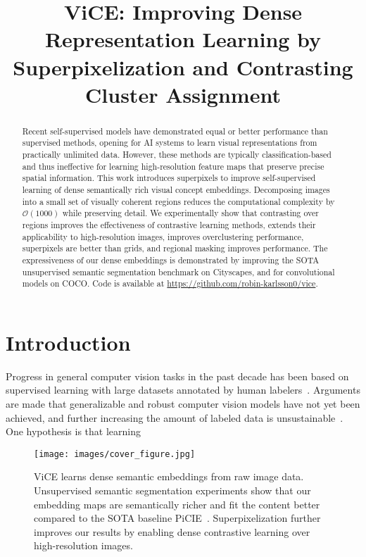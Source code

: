 \documentclass{bmvc2k}
\title{ViCE: Improving Dense Representation Learning by Superpixelization and Contrasting Cluster Assignment}
\begin{document}
\maketitle

\begin{abstract}
Recent self-supervised models have demonstrated equal or better performance than supervised methods, opening for AI systems to learn visual representations from practically unlimited data. However, these methods are typically classification-based and thus ineffective for learning high-resolution feature maps that preserve precise spatial information. This work introduces superpixels to improve self-supervised learning of dense semantically rich visual concept embeddings. Decomposing images into a small set of visually coherent regions reduces the computational complexity by $\mathcal{O}(1000)$ while preserving detail. We experimentally show that contrasting over regions improves the effectiveness of contrastive learning methods, extends their applicability to high-resolution images, improves overclustering performance, superpixels are better than grids, and regional masking improves performance. The expressiveness of our dense embeddings is demonstrated by improving the SOTA unsupervised semantic segmentation benchmark on Cityscapes, and for convolutional models on COCO. Code is available at \url{https://github.com/robin-karlsson0/vice}.
\end{abstract}



\section{Introduction}
\label{sec:introduction}

Progress in general computer vision tasks in the past decade has been based on supervised learning with large datasets annotated by human labelers~\cite{Krizhevsky2012ImageNetConv}. Arguments are made that generalizable and robust computer vision models have not yet been achieved, and further increasing the amount of labeled data is unsustainable~\cite{LeCunn2020AAAI20SSL, Marcus2019RebootingAI}. One hypothesis is that learning

\begin{figure}[h]
\begin{center}
\texttt{[image: images/cover\_figure.jpg]}
\end{center}
   \caption{ViCE learns dense semantic embeddings from raw image data. Unsupervised semantic segmentation experiments show that our embedding maps are semantically richer and fit the content better compared to the SOTA baseline PiCIE~\cite{Cho2021PiCIE}. Superpixelization further improves our results by enabling dense contrastive learning over high-resolution images.}
\label{fig:front_cover}
\end{figure}
\end{document}
